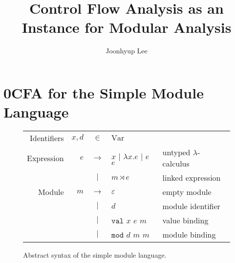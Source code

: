 \documentclass{article}
\title{Control Flow Analysis as an Instance for Modular Analysis}
\author{Joonhyup Lee}
\theoremstyle{definition}
\newcommand*{\vbar}{|}
\newcommand*{\ExprVar}{\text{Var}}
\newcommand*{\modid}{d}
\newcommand*{\link}[2]{{#1}\rtimes{#2}}
\newcommand*{\Lete}{\mathtt{val}}
\newcommand*{\Letm}{\mathtt{mod}}
\begin{document}
\maketitle
\section{0CFA for the Simple Module Language}
\begin{figure}[htb]
  \centering
  \begin{tabular}{rrcll}
    Identifiers & $x,\modid$ & $\in$         & $\ExprVar$                                                             \\
    Expression  & $e$        & $\rightarrow$ & $x$ $\vbar$ $\lambda x.e$ $\vbar$ $e$ $e$ & untyped $\lambda$-calculus \\
                &            & $\vbar$       & $\link{m}{e}$                             & linked expression          \\
    Module      & $m$        & $\rightarrow$ & $\varepsilon$                             & empty module               \\
                &            & $\vbar$       & $\modid$                                  & module identifier          \\
                &            & $\vbar$       & $\Lete$ $x$ $e$ $m$                       & value binding              \\
                &            & $\vbar$       & $\Letm$ $\modid$ $m$ $m$                  & module binding             \\
  \end{tabular}
  \caption{Abstract syntax of the simple module language.}
  \label{fig:syntax}
\end{figure}
\end{document}
